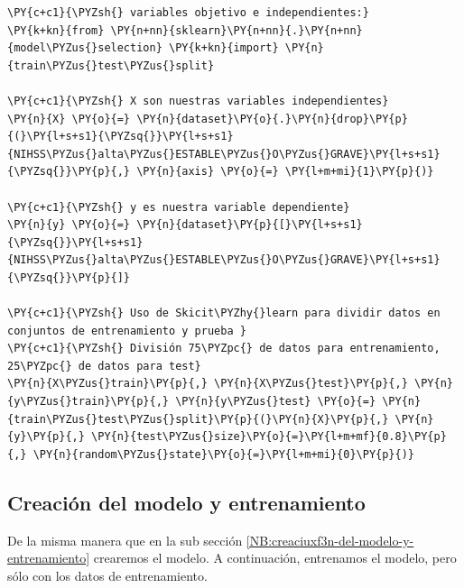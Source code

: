    \begin{tcolorbox}[breakable, size=fbox, boxrule=1pt, pad at break*=1mm,colback=cellbackground, colframe=cellborder]
\begin{Verbatim}[commandchars=\\\{\}]
\PY{c+c1}{\PYZsh{} variables objetivo e independientes:}
\PY{k+kn}{from} \PY{n+nn}{sklearn}\PY{n+nn}{.}\PY{n+nn}{model\PYZus{}selection} \PY{k+kn}{import} \PY{n}{train\PYZus{}test\PYZus{}split}

\PY{c+c1}{\PYZsh{} X son nuestras variables independientes}
\PY{n}{X} \PY{o}{=} \PY{n}{dataset}\PY{o}{.}\PY{n}{drop}\PY{p}{(}\PY{l+s+s1}{\PYZsq{}}\PY{l+s+s1}{NIHSS\PYZus{}alta\PYZus{}ESTABLE\PYZus{}O\PYZus{}GRAVE}\PY{l+s+s1}{\PYZsq{}}\PY{p}{,} \PY{n}{axis} \PY{o}{=} \PY{l+m+mi}{1}\PY{p}{)}

\PY{c+c1}{\PYZsh{} y es nuestra variable dependiente}
\PY{n}{y} \PY{o}{=} \PY{n}{dataset}\PY{p}{[}\PY{l+s+s1}{\PYZsq{}}\PY{l+s+s1}{NIHSS\PYZus{}alta\PYZus{}ESTABLE\PYZus{}O\PYZus{}GRAVE}\PY{l+s+s1}{\PYZsq{}}\PY{p}{]}

\PY{c+c1}{\PYZsh{} Uso de Skicit\PYZhy{}learn para dividir datos en conjuntos de entrenamiento y prueba }
\PY{c+c1}{\PYZsh{} División 75\PYZpc{} de datos para entrenamiento, 25\PYZpc{} de datos para test}
\PY{n}{X\PYZus{}train}\PY{p}{,} \PY{n}{X\PYZus{}test}\PY{p}{,} \PY{n}{y\PYZus{}train}\PY{p}{,} \PY{n}{y\PYZus{}test} \PY{o}{=} \PY{n}{train\PYZus{}test\PYZus{}split}\PY{p}{(}\PY{n}{X}\PY{p}{,} \PY{n}{y}\PY{p}{,} \PY{n}{test\PYZus{}size}\PY{o}{=}\PY{l+m+mf}{0.8}\PY{p}{,} \PY{n}{random\PYZus{}state}\PY{o}{=}\PY{l+m+mi}{0}\PY{p}{)}
\end{Verbatim}
\end{tcolorbox}

    \hypertarget{creaciuxf3n-del-modelo-y-entrenamiento}{%
\subsection{Creación del modelo y entrenamiento}\label{creaciuxf3n-del-modelo-y-entrenamiento}}

	De la misma manera que en la sub sección \ref{NB:creaciuxf3n-del-modelo-y-entrenamiento} crearemos el modelo.
	A continuación, entrenamos el modelo, pero sólo con los datos de entrenamiento. 

